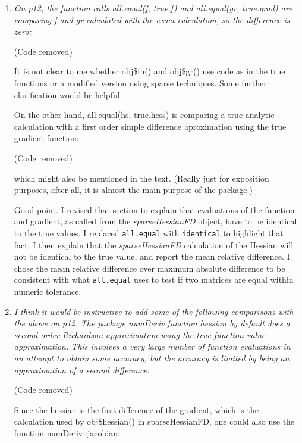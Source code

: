 \documentclass{article}
\newcommand{\code}[1]{\texttt{#1}}
\newcommand{\func}[1]{\code{#1}}
\newcommand{\class}[1]{\textsl{#1}}
\newenvironment{revQuote}{\itshape}{\vspace{\baselineskip}}
\newenvironment{response}{\normalfont}{\vspace{\baselineskip}}
\begin{document}
\begin{enumerate}[align=left]
\item \begin{revQuote}
On p12, the function calls all.equal(f, true.f) and all.equal(gr,
true.grad) are comparing f and gr calculated with the exact calculation, so
the difference is zero:

(Code removed)

It is not clear to me whether obj\$fn() and obj\$gr() use code as in the true
functions or a modified version using sparse techniques. Some further
clarification would be helpful.

On the other hand, all.equal(hs, true.hess) is comparing a true analytic
calculation with a first order simple difference aproximation using the true
gradient function:

(Code removed)

which might also be mentioned in the text. (Really just for exposition
purposes, after all, it is almost the main purpose of the package.)
  \end{revQuote}

\begin{response}
  Good point.  I revised that section to explain that evaluations of
  the function and gradient, as called from the
  \class{sparseHessianFD} object, have to be identical to the true values.
  I replaced \func{all.equal} with \func{identical} to
  highlight that fact. I then explain that the
  \class{sparseHessianFD} calculation of the Hessian will not be
  identical to the true value, and report the mean relative
  difference.  I chose the mean relative difference over maximum
  absolute difference to be consistent with what \func{all.equal}
  uses to test if two matrices are equal within numeric tolerance.
\end{response}


\item \label{it:complex1}\begin{revQuote}
I think it would be instructive to add some of the following comparisons
with the above on p12.  The package numDeriv function hessian by default
does a second order Richardson approximation using the true function value
approximation. This involves a very large number of function evaluations in
an attempt to obtain some accuracy, but the accuracy is limited by being an
approximation of a second difference:

(Code removed)

Since the hessian is the first difference of the gradient, which is the
calculation used by obj\$hessian() in sparseHessianFD, one could also use the
function numDeriv::jacobian:


\end{revQuote}
\end{enumerate}
\end{document}
